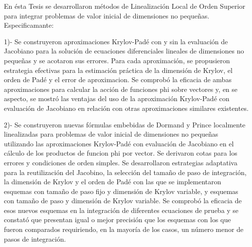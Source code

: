 \begin{conclusions}

    
    En ésta Tesis se desarrollaron métodos de Linealización Local de Orden Superior para integrar problemas de valor
    inicial de dimensiones no pequeñas. Especificamante: 

    1)- Se construyeron aproximaciones Krylov-Padé con y sin la evaluación de Jacobiano para la solución de ecuaciones diferenciales lineales de dimensiones no pequeñas y se acotaron sus errores. Para cada aproximación, se propusieron estrategia efectivas para la estimación práctica de la dimensión de Krylov, el orden de Padé y el error de aproximacion. Se comprobó la eficacia de ambas aproximaciones para calcular la acción de funciones phi sobre vectores y, en se aspecto, se mostró las ventajas del uso de la aproximación Krylov-Padé con evaluación de Jacobiano en relación con otras aproximaciones similares existentes. 
    
    
    2)- Se construyeron nuevas fórmulas embebidas de Dormand y Prince localmente linealizadas para problemas de valor inicial de dimensiones no pequeñas utilizando las aproximaciones Krylov-Padé con evaluación de Jacobiano en el cálculo de los productos de funcion phi por vector. Se derivaron cotas para los errores y condiciones de orden simples. Se  desarrollaron estrategias adaptativa para la reutilización del Jacobino, la selección del tamaño de paso de integración, la dimensión de Krylov y el orden de Padé con las que se implementaron esquemas con tamaño de paso fijo y dimensión de Krylov variable, y esquemas con tamaño de paso y dimensión de Krylov variable. Se comprobó la eficacia de esos nuevos esquemas en la integración de diferentes ecuaciones de prueba y se constató que presentan igual o mejor precisión que los esquemas con los que fueron comparados requiriendo, en la mayoría de los casos, un número menor de pasos de integración.
    

\end{conclusions}
